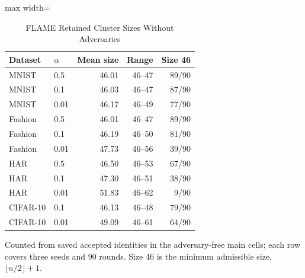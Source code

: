 \begin{table}[!t]
\centering\footnotesize
\setlength{\tabcolsep}{4pt}
\caption{FLAME Retained Cluster Sizes Without Adversaries}\label{tab:flame_sizes}
\begin{adjustbox}{max width=\columnwidth}
\begin{tabular}{llrrr}
\toprule
Dataset & $\alpha$ & Mean size & Range & Size 46 \\
\midrule
MNIST & 0.5 & 46.01 & 46--47 & 89/90 \\
MNIST & 0.1 & 46.03 & 46--47 & 87/90 \\
MNIST & 0.01 & 46.17 & 46--49 & 77/90 \\
Fashion & 0.5 & 46.01 & 46--47 & 89/90 \\
Fashion & 0.1 & 46.19 & 46--50 & 81/90 \\
Fashion & 0.01 & 47.73 & 46--56 & 39/90 \\
HAR & 0.5 & 46.50 & 46--53 & 67/90 \\
HAR & 0.1 & 47.30 & 46--51 & 38/90 \\
HAR & 0.01 & 51.83 & 46--62 & 9/90 \\
CIFAR-10 & 0.1 & 46.13 & 46--48 & 79/90 \\
CIFAR-10 & 0.01 & 49.09 & 46--61 & 64/90 \\
\bottomrule
\end{tabular}
\end{adjustbox}

\par\vspace{3pt}\parbox{\linewidth}{\footnotesize Counted from saved accepted identities in the adversary-free main cells; each row covers three seeds and 90 rounds. Size 46 is the minimum admissible size, $\lfloor n/2\rfloor+1$.}
\end{table}
